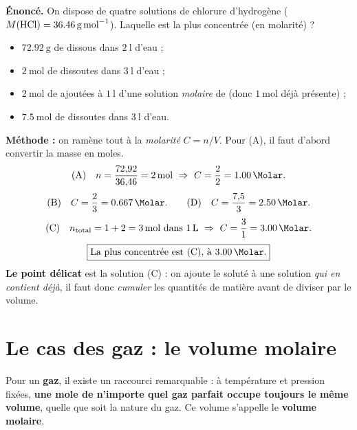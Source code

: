 \documentclass[11pt,a4paper]{article}
\begin{document}
\begin{exemple}\label{ex:hcl}
\textbf{Énoncé.} On dispose de quatre solutions de chlorure d'hydrogène 
($M(\ce{HCl}) = \SI{36.46}{\gram\per\mole}$). Laquelle est la plus concentrée (en molarité) ?
\begin{itemize}[leftmargin=1.6em,topsep=2pt,itemsep=1pt]
  \item[(A)] $\SI{72.92}{\gram}$ de  dissous dans $\SI{2}{\litre}$ d'eau ;
  \item[(B)] $\SI{2}{\mole}$ de  dissoutes dans $\SI{3}{\litre}$ d'eau ;
  \item[(C)] $\SI{2}{\mole}$ de  ajoutées à $\SI{1}{\litre}$ d'une solution \emph{molaire} de  (donc $\SI{1}{\mole}$ déjà présente) ;
  \item[(D)] $\SI{7.5}{\mole}$ de  dissoutes dans $\SI{3}{\litre}$ d'eau.
\end{itemize}

\smallskip
\textbf{Méthode :} on ramène tout à la \emph{molarité} $C = n/V$. Pour (A), il faut d'abord convertir
la masse en moles.
\[ \text{(A)}\quad n = \frac{72{,}92}{36{,}46} = \SI{2}{\mole}\ \Rightarrow\ C = \frac{2}{2} = \SI{1.00}{\Molar}. \]
\[ \text{(B)}\quad C = \frac{2}{3} = \SI{0.667}{\Molar}. \qquad
   \text{(D)}\quad C = \frac{7{,}5}{3} = \SI{2.50}{\Molar}. \]
\[ \text{(C)}\quad n_{\text{total}} = 1 + 2 = \SI{3}{\mole}\ \text{dans}\ \SI{1}{\litre}\ \Rightarrow\
   C = \frac{3}{1} = \SI{3.00}{\Molar}. \]
\[ \boxed{\text{La plus concentrée est (C), à } \SI{3.00}{\Molar}.} \]
\textbf{Le point délicat} est la solution (C) : on ajoute le soluté à une solution \emph{qui en
contient déjà}, il faut donc \emph{cumuler} les quantités de matière avant de diviser par le volume.
\end{exemple}

\section{Le cas des gaz : le volume molaire}
Pour un \textbf{gaz}, il existe un raccourci remarquable : à température et pression fixées,
\textbf{une mole de n'importe quel gaz parfait occupe toujours le même volume}, quelle que soit la
nature du gaz. Ce volume s'appelle le \textbf{volume molaire}.
\end{document}
